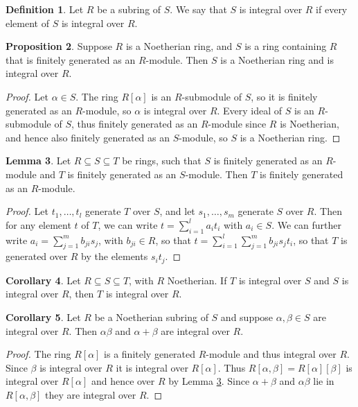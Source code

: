 \documentclass{article}
\renewcommand{\sb}[1]{\left[ #1 \right]}
\theoremstyle{definition}\newtheorem{definition}{Definition}[subsection]
\theoremstyle{definition}\newtheorem{remark}[definition]{Remark}
\theoremstyle{definition}\newtheorem*{example}{Example}
\theoremstyle{definition}\newtheorem*{note}{Note}
\newtheorem{proposition}[definition]{Proposition}
\newtheorem{lemma}[definition]{Lemma}
\newtheorem{corollary}[definition]{Corollary}
\begin{document}
\begin{definition}
Let $ R $ be a subring of $ S $. We say that $ S $ is integral over $ R $ if every element of $ S $ is integral over $ R $.
\end{definition}

\begin{proposition}
Suppose $ R $ is a Noetherian ring, and $ S $ is a ring containing $ R $ that is finitely generated as an $ R $-module. Then $ S $ is a Noetherian ring and is integral over $ R $.
\end{proposition}

\begin{proof}
Let $ \alpha \in S $. The ring $ R\sb{\alpha} $ is an $ R $-submodule of $ S $, so it is finitely generated as an $ R $-module, so $ \alpha $ is integral over $ R $. Every ideal of $ S $ is an $ R $-submodule of $ S $, thus finitely generated as an $ R $-module since $ R $ is Noetherian, and hence also finitely generated as an $ S $-module, so $ S $ is a Noetherian ring.
\end{proof}

\begin{lemma}
\label{lem:10.1.5}
Let $ R \subseteq S \subseteq T $ be rings, such that $ S $ is finitely generated as an $ R $-module and $ T $ is finitely generated as an $ S $-module. Then $ T $ is finitely generated as an $ R $-module.
\end{lemma}

\begin{proof}
Let $ t_1, \dots, t_l $ generate $ T $ over $ S $, and let $ s_1, \dots, s_m $ generate $ S $ over $ R $. Then for any element $ t $ of $ T $, we can write $ t = \sum_{i = 1}^l a_it_i $ with $ a_i \in S $. We can further write $ a_i = \sum_{j = 1}^m b_{ji}s_j $, with $ b_{ji} \in R $, so that $ t = \sum_{i = 1}^l \sum_{j = 1}^m b_{ji}s_jt_i $, so that $ T $ is generated over $ R $ by the elements $ s_it_j $.
\end{proof}

\begin{corollary}
Let $ R \subseteq S \subseteq T $, with $ R $ Noetherian. If $ T $ is integral over $ S $ and $ S $ is integral over $ R $, then $ T $ is integral over $ R $.
\end{corollary}

\begin{corollary}
Let $ R $ be a Noetherian subring of $ S $ and suppose $ \alpha, \beta \in S $ are integral over $ R $. Then $ \alpha\beta $ and $ \alpha + \beta $ are integral over $ R $.
\end{corollary}

\begin{proof}
The ring $ R\sb{\alpha} $ is a finitely generated $ R $-module and thus integral over $ R $. Since $ \beta $ is integral over $ R $ it is integral over $ R\sb{\alpha} $. Thus $ R\sb{\alpha, \beta} = R\sb{\alpha}\sb{\beta} $ is integral over $ R\sb{\alpha} $ and hence over $ R $ by Lemma \ref{lem:10.1.5}. Since $ \alpha + \beta $ and $ \alpha\beta $ lie in $ R\sb{\alpha, \beta} $ they are integral over $ R $.
\end{proof}
\end{document}
